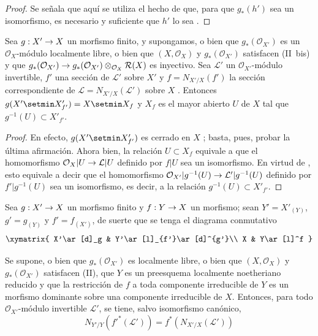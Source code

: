 \documentclass[oneside,10pt]{amsart}
\makeatletter
\newcommand{\ega@arrow}[2]{\mathchoice{#1}{#2}{#2}{#2}}
\renewcommand{\to}{\ega@arrow{\longrightarrow}{\rightarrow}}
\newcommand{\oldpage}[2][]{\marginnote{\normalfont\footnotesize\textbf{#1}~|~#2}\ignorespaces}
\let\EGAOriginalLabel\label
\renewcommand{\label}[1]{\phantomsection\EGAOriginalLabel{#1}}
\makeatother
\begin{document}
\begin{proof}
Se señala que aquí se utiliza el hecho de que, para que $g_*(h')$ sea un isomorfismo, es necesario y suficiente que $h'$ lo sea .
\end{proof}

\begin{corollary}[6.5.7]
\label{II.6.5.7-fr}
Sea $g:X'\to X$ un morfismo finito, y supongamos, o bien que $g_*(\mathcal{O}_{X'})$ es un $\mathcal{O}_X$-módulo localmente libre, o bien que $(X,\mathcal{O}_X)$ y $g_*(\mathcal{O}_{X'})$ satisfacen \textup{(II~bis)} y que
$g_*(\mathcal{O}_{X'})\to
g_*(\mathcal{O}_{X'})\otimes_{\mathcal{O}_X}\mathcal{R}(X)$
es inyectivo.
Sea $\mathcal{L}'$ un $\mathcal{O}_{X'}$-módulo invertible, $f'$ una sección de $\mathcal{L}'$ sobre $X'$ y $f=N_{X'/X}(f')$ la sección correspondiente de $\mathcal{L}=N_{X'/X}(\mathcal{L}')$ sobre $X$ .
\oldpage[II]{130}
Entonces
$g(X'\setmin X'_{f'})=X\setmin X_f$
y $X_f$ es el mayor abierto $U$ de $X$ tal que $g^{-1}(U)\subset X'_{f'}$.
\end{corollary}

\begin{proof}
En efecto, $g(X'\setmin X'_{f'})$ es cerrado en $X$ ;
basta, pues, probar la última afirmación.
Ahora bien, la relación $U\subset X_f$ equivale a que el homomorfismo $\mathcal{O}_X|U\to\mathcal{L}|U$ definido por $f|U$ sea un isomorfismo.
En virtud de , esto equivale a decir que el homomorfismo
$\mathcal{O}_{X'}|g^{-1}(U)\to\mathcal{L}'|g^{-1}(U)$
definido por $f'|g^{-1}(U)$ sea un isomorfismo, es decir, a la relación $g^{-1}(U)\subset X'_{f'}$.
\end{proof}


\begin{proposition}[6.5.8]
\label{II.6.5.8-fr}
Sea $g:X'\to X$ un morfismo finito y $f:Y\to X$ un morfismo;
sean $Y'=X'_{(Y)}$, $g'=g_{(Y)}$ y $f'=f_{(X')}$, de suerte que se tenga el diagrama conmutativo
\[
\xymatrix{
X'\ar[d]_g & Y'\ar[l]_{f'}\ar[d]^{g'}\\
X & Y\ar[l]^f
}
\]

Se supone, o bien que $g_*(\mathcal{O}_{X'})$ es localmente libre, o bien que $(X,\mathcal{O}_X)$ y $g_*(\mathcal{O}_{X'})$ satisfacen \textup{(II)}, que $Y$ es un preesquema localmente noetheriano reducido y que la restricción de $f$ a toda componente irreducible de $Y$ es un morfismo dominante sobre una componente irreducible de $X$.
Entonces, para todo $\mathcal{O}_{X'}$-módulo invertible $\mathcal{L}'$, se tiene, salvo isomorfismo canónico,
\[
N_{Y'/Y}({f'}^*(\mathcal{L}'))=f^*(N_{X'/X}(\mathcal{L}'))
\]
\end{proposition}
\end{document}
